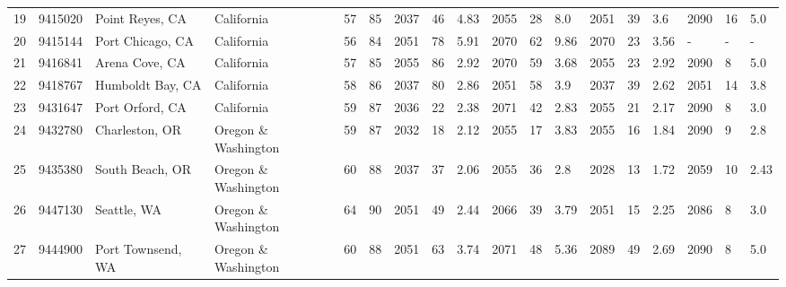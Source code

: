 \begin{longtable}{llllllllllllllllll}
19 &          9415020 &             Point Reyes, CA &               California &              57 &       85 &                      2037 &   46 &   4.83 &     2055 &   28 &    8.0 &                          2051 &  39 &   3.6 &     2090 &   16 &   5.0 \\
20 &          9415144 &            Port Chicago, CA &               California &              56 &       84 &                      2051 &   78 &   5.91 &     2070 &   62 &   9.86 &                          2070 &  23 &  3.56 &        - &    - &     - \\
21 &          9416841 &              Arena Cove, CA &               California &              57 &       85 &                      2055 &   86 &   2.92 &     2070 &   59 &   3.68 &                          2055 &  23 &  2.92 &     2090 &    8 &   5.0 \\
22 &          9418767 &            Humboldt Bay, CA &               California &              58 &       86 &                      2037 &   80 &   2.86 &     2051 &   58 &    3.9 &                          2037 &  39 &  2.62 &     2051 &   14 &   3.8 \\
23 &          9431647 &             Port Orford, CA &               California &              59 &       87 &                      2036 &   22 &   2.38 &     2071 &   42 &   2.83 &                          2055 &  21 &  2.17 &     2090 &    8 &   3.0 \\
24 &          9432780 &              Charleston, OR &      Oregon \& Washington &              59 &       87 &                      2032 &   18 &   2.12 &     2055 &   17 &   3.83 &                          2055 &  16 &  1.84 &     2090 &    9 &   2.8 \\
25 &          9435380 &             South Beach, OR &      Oregon \& Washington &              60 &       88 &                      2037 &   37 &   2.06 &     2055 &   36 &    2.8 &                          2028 &  13 &  1.72 &     2059 &   10 &  2.43 \\
26 &          9447130 &                 Seattle, WA &      Oregon \& Washington &              64 &       90 &                      2051 &   49 &   2.44 &     2066 &   39 &   3.79 &                          2051 &  15 &  2.25 &     2086 &    8 &   3.0 \\
27 &          9444900 &           Port Townsend, WA &      Oregon \& Washington &              60 &       88 &                      2051 &   63 &   3.74 &     2071 &   48 &   5.36 &                          2089 &  49 &  2.69 &     2090 &    8 &   5.0 \\

\end{longtable}
